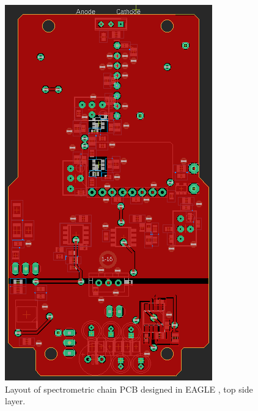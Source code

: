 \begin{figure}[H]
 \centering
 \includegraphics[scale=0.8, angle = 90]{./pictures/S14topLay.png}
 \caption{Layout of spectrometric chain PCB designed in EAGLE \cite{eagle}, top side layer.}
 \label{layout top}
 
\end{figure}

